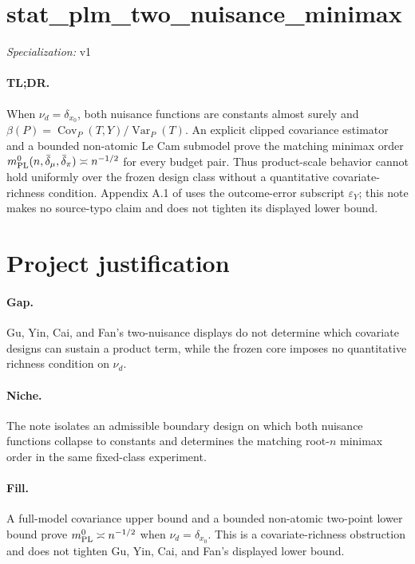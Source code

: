 \documentclass{article}
\begin{document}
\sloppy

\section*{stat\_\allowbreak{}plm\_\allowbreak{}two\_\allowbreak{}nuisance\_\allowbreak{}minimax}

\noindent\textit{Specialization:} v1\par

\paragraph{TL;DR.} When \(\nu_d=\delta_{x_0}\), both nuisance functions are constants almost surely and \(\beta(P)=\operatorname{Cov}_P(T,Y)/\operatorname{Var}_P(T)\). An explicit clipped covariance estimator and a bounded non-atomic Le Cam submodel prove the matching minimax order \(m_{\rm PL}^{0}(n,\bar\delta_\mu,\bar\delta_\pi)\asymp n^{-1/2}\) for every budget pair. Thus product-scale behavior cannot hold uniformly over the frozen design class without a quantitative covariate-richness condition. Appendix A.1 of \cite{gu2026optimally} uses the outcome-error subscript \(\varepsilon_Y\); this note makes no source-typo claim and does not tighten its displayed lower bound.

\section{Project justification}

\paragraph{Gap.} Gu, Yin, Cai, and Fan's two-nuisance displays do not determine which covariate designs can sustain a product term, while the frozen core imposes no quantitative richness condition on \(\nu_d\).

\paragraph{Niche.} The note isolates an admissible boundary design on which both nuisance functions collapse to constants and determines the matching root-\(n\) minimax order in the same fixed-class experiment.

\paragraph{Fill.} A full-model covariance upper bound and a bounded non-atomic two-point lower bound prove \(m_{\rm PL}^{0}\asymp n^{-1/2}\) when \(\nu_d=\delta_{x_0}\). This is a covariate-richness obstruction and does not tighten Gu, Yin, Cai, and Fan's displayed lower bound.
\end{document}
